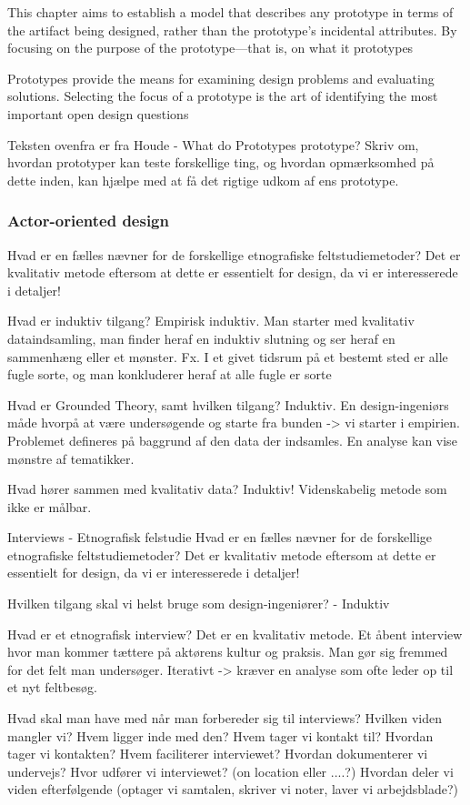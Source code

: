 This chapter aims to establish a model that describes any prototype in terms of the artifact being designed, rather than the prototype's incidental attributes. By focusing on the purpose of the prototype—that is, on what it prototypes

Prototypes provide the means for examining design problems and evaluating solutions. Selecting the focus of a prototype is the art of identifying the most important open design questions

Teksten ovenfra er fra Houde - What do Prototypes prototype?
Skriv om, hvordan prototyper kan teste forskellige ting, og hvordan opmærksomhed på dette inden, kan hjælpe med at få det rigtige udkom af ens prototype.

\subsubsection{Actor-oriented design}
Hvad er en fælles nævner for de forskellige etnografiske feltstudiemetoder?
Det er kvalitativ metode eftersom at dette er essentielt for design, da vi er interesserede i detaljer!

Hvad er induktiv tilgang?
Empirisk induktiv. Man starter med kvalitativ dataindsamling, man finder heraf en induktiv slutning og ser heraf en sammenhæng eller et mønster.
Fx. I et givet tidsrum på et bestemt sted er alle fugle sorte, og man konkluderer heraf at alle fugle er sorte

Hvad er Grounded Theory, samt hvilken tilgang?
Induktiv. En design-ingeniørs måde hvorpå at være undersøgende og starte fra bunden -> vi starter i empirien.
Problemet defineres på baggrund af den data der indsamles. En analyse kan vise mønstre af tematikker.

Hvad hører sammen med kvalitativ data?
Induktiv! Videnskabelig metode som ikke er målbar.

Interviews - Etnografisk felstudie
Hvad er en fælles nævner for de forskellige etnografiske feltstudiemetoder?
Det er kvalitativ metode eftersom at dette er essentielt for design, da vi er interesserede i detaljer!

Hvilken tilgang skal vi helst bruge som design-ingeniører? - Induktiv

Hvad er et etnografisk interview?
Det er en kvalitativ metode.
Et åbent interview hvor man kommer tættere på aktørens kultur og praksis.
Man gør sig fremmed for det felt man undersøger.
Iterativt -> kræver en analyse som ofte leder op til et nyt feltbesøg.

Hvad skal man have med når man forbereder sig til interviews?
Hvilken viden mangler vi?
Hvem ligger inde med den?
Hvem tager vi kontakt til? Hvordan tager vi kontakten?
Hvem faciliterer interviewet?
Hvordan dokumenterer vi undervejs?
Hvor udfører vi interviewet? (on location eller ....?)
Hvordan deler vi viden efterfølgende (optager vi samtalen, skriver vi noter, laver vi arbejdsblade?)

